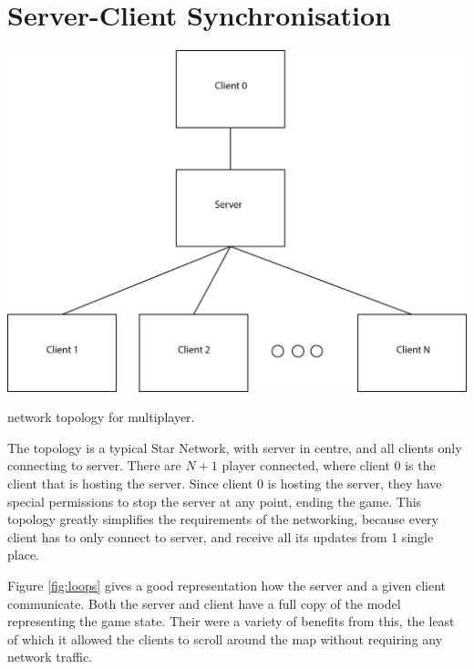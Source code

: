 
\section{Server-Client Synchronisation}

\newcommand{\stepOneName}{lockstep}
\newcommand{\stepTwoName}{simple server client}
\newcommand{\stepThreeName}{server client with simulation}

\begin{marginfigure}
	\includegraphics{res/computer_communication_architecture/NetworkTopology.png}
	\caption{
	network topology for multiplayer.
	}
	\label{fig:serverClientSychNetworkTopology}
\end{marginfigure}

The topology is a typical Star Network, with server in centre, and all clients only connecting to server.
There are $N+1$ player connected, where client 0 is the client that is hosting the server.
Since client 0 is hosting the server, they have special permissions to stop the server at any point, ending the game.
This topology greatly simplifies the requirements of the networking, because every client has to only connect to server, and receive all its updates from 1 single place. 

Figure \ref{fig:loops} gives a good representation how the server and a given client communicate.
Both the server and client have a full copy of the model representing the game state.
Their were a variety of benefits from this, the least of which it allowed the clients to scroll around the map without requiring any network traffic.

